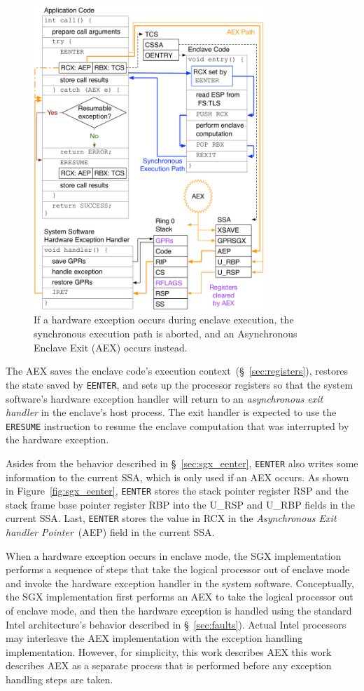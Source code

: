 \begin{figure}[hbt]
  \centering
  \includegraphics[width=87mm]{figures/sgx_aex_setup.pdf}
  \caption{
    If a hardware exception occurs during enclave execution, the synchronous
    execution path is aborted, and an Asynchronous Enclave Exit (AEX) occurs
    instead.
  }
  \label{fig:sgx_aex_setup}
\end{figure}

The AEX saves the enclave code's execution context~(\S~\ref{sec:registers}),
restores the state saved by \texttt{EENTER}, and sets up the processor
registers so that the system software's hardware exception handler will return
to an \textit{asynchronous exit handler} in the enclave's host process. The
exit handler is expected to use the \texttt{ERESUME} instruction to resume the
enclave computation that was interrupted by the hardware exception.

Asides from the behavior described in \S~\ref{sec:sgx_eenter}, \texttt{EENTER}
also writes some information to the current SSA, which is only used if an AEX
occurs. As shown in Figure~\ref{fig:sgx_eenter}, \texttt{EENTER} stores the
stack pointer register RSP and the stack frame base pointer register RBP into
the U\_RSP and U\_RBP fields in the current SSA. Last, \texttt{EENTER} stores
the value in RCX in the \textit{Asynchronous Exit handler Pointer}~(AEP) field
in the current SSA.

When a hardware exception occurs in enclave mode, the SGX implementation
performs a sequence of steps that take the logical processor out of enclave
mode and invoke the hardware exception handler in the system software.
Conceptually, the SGX implementation first performs an AEX to take the logical
processor out of enclave mode, and then the hardware exception is handled
using the standard Intel architecture's behavior described in
\S~\ref{sec:faults}). Actual Intel processors may interleave the AEX
implementation with the exception handling implementation. However, for
simplicity, this work describes AEX this work describes AEX as a separate
process that is performed before any exception handling steps are taken.

